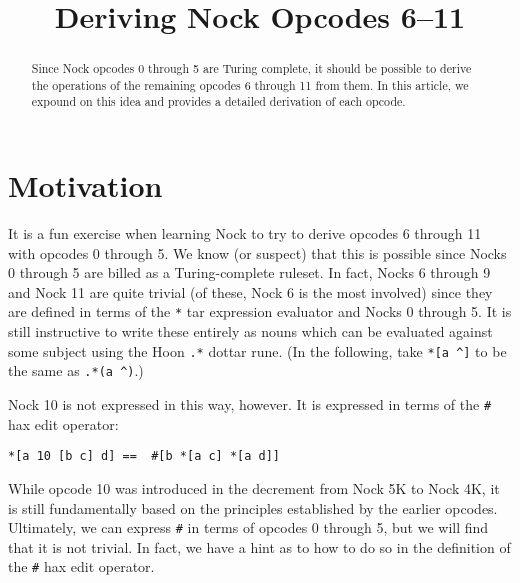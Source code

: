 \documentclass[twoside]{article}
\title{Deriving Nock Opcodes 6–11}
\author{\authorpatp}
\date{}
\begin{document}
\maketitle
\thispagestyle{firststyle}

\begin{abstract}
  Since Nock opcodes 0 through 5 are Turing complete, it should be possible to derive the operations of the remaining opcodes 6 through 11 from them.  In this article, we expound on this idea and provides a detailed derivation of each opcode.
\end{abstract}

\setcounter{page}{1}

\tableofcontents

\section{Motivation}

It is a fun exercise when learning Nock to try to derive opcodes 6 through 11 with opcodes 0 through 5. We know (or suspect) that this is possible since Nocks 0 through 5 are billed as a Turing-complete ruleset. In fact, Nocks 6 through 9 and Nock 11 are quite trivial (of these, Nock 6 is the most involved) since they are defined in terms of the \lstinline[style=inlinecode]{*} tar expression evaluator and Nocks 0 through 5. It is still instructive to write these entirely as nouns which can be evaluated against some subject using the Hoon \lstinline[style=inlinecode]{.*} dottar rune. (In the following, take \lstinline[style=inlinecode]{*[a ^]} to be the same as \lstinline[style=inlinecode]{.*(a ^)}.)

Nock 10 is not expressed in this way, however. It is expressed in terms of the \lstinline[style=inlinecode]{#} hax edit operator:

\begin{lstlisting}[style=listingcode]
*[a 10 [b c] d] ==  #[b *[a c] *[a d]]
\end{lstlisting}

\noindent
While opcode 10 was introduced in the decrement from Nock 5K to Nock 4K, it is still fundamentally based on the principles established by the earlier opcodes.  Ultimately, we can express \lstinline[style=inlinecode]{#} in terms of opcodes 0 through 5, but we will find that it is not trivial. In fact, we have a hint as to how to do so in the definition of the \lstinline[style=inlinecode]{#} hax edit operator.
\end{document}
